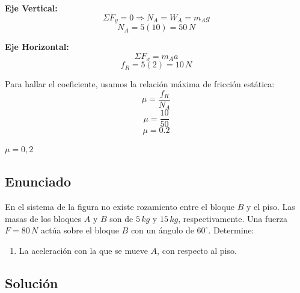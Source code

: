 \documentclass[12pt, a4paper]{article}
\begin{document}
\textbf{Eje Vertical:}
$$ \Sigma F_y = 0 \Rightarrow N_A = W_A = m_A g $$
$$ N_A = 5(10) = 50 \, \si{N} $$

\textbf{Eje Horizontal:}
$$ \Sigma F_x = m_A a $$
$$ f_R = 5(2) = 10 \, \si{N} $$

Para hallar el coeficiente, usamos la relación máxima de fricción estática:
$$ \mu = \frac{f_R}{N_A} $$
$$ \mu = \frac{10}{50} $$
$$ \boxed{\mu = 0.2} $$

\begin{tcolorbox}[colback=green!5!white, colframe=green!50!black, title=Respuesta Final]
\centering \Large $\mu = 0,2 $
\end{tcolorbox}

\newpage

\subsection*{Enunciado}
En el sistema de la figura no existe rozamiento entre el bloque $B$ y el piso. Las masas de los bloques $A$ y $B$ son de $5 \, \si{kg}$ y $15 \, \si{kg}$, respectivamente. Una fuerza $F = 80 \, \si{N}$ actúa sobre el bloque $B$ con un ángulo de $60^\circ$. Determine:
\begin{enumerate}[label=\alph*)]
    \item La aceleración con la que se mueve $A$, con respecto al piso.
\end{enumerate}

\begin{center}
\end{center}

\subsection*{Solución}
\end{document}
